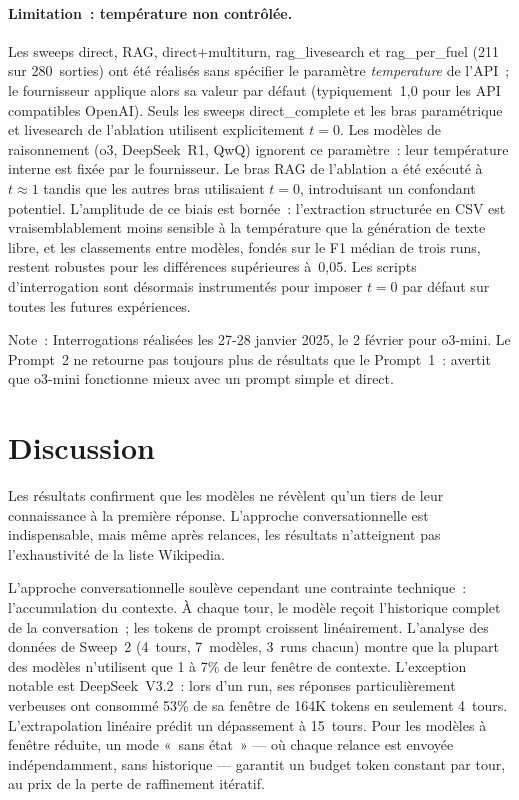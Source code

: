\documentclass[a4paper,11pt]{report}
\begin{document}
\paragraph{Limitation~: température non contrôlée.}\label{sec:temperature-limitation}
Les sweeps direct, RAG, direct+multiturn, rag\_livesearch et rag\_per\_fuel (211 sur 280~sorties) ont été réalisés sans spécifier le paramètre \emph{temperature} de l'API~; le fournisseur applique alors sa valeur par défaut (typiquement~1,0 pour les API compatibles OpenAI). Seuls les sweeps direct\_complete et les bras paramétrique et livesearch de l'ablation utilisent explicitement $t{=}0$. Les modèles de raisonnement (o3, DeepSeek~R1, QwQ) ignorent ce paramètre~: leur température interne est fixée par le fournisseur. Le bras RAG de l'ablation a été exécuté à $t{\approx}1$ tandis que les autres bras utilisaient $t{=}0$, introduisant un confondant potentiel. L'amplitude de ce biais est bornée~: l'extraction structurée en CSV est vraisemblablement moins sensible à la température que la génération de texte libre, et les classements entre modèles, fondés sur le F1 médian de trois runs, restent robustes pour les différences supérieures à~0,05. Les scripts d'interrogation sont désormais instrumentés pour imposer $t{=}0$ par défaut sur toutes les futures expériences.


Note~: Interrogations réalisées les 27-28 janvier 2025, le 2 février pour o3-mini. Le Prompt~2 ne retourne pas toujours plus de résultats que le Prompt~1~: \citep{2UNSUP7I} avertit que o3-mini fonctionne mieux avec un prompt simple et direct.

\section{Discussion}

Les résultats confirment que les modèles ne révèlent qu'un tiers de leur connaissance à la première réponse. L'approche conversationnelle est indispensable, mais même après relances, les résultats n'atteignent pas l'exhaustivité de la liste Wikipedia.

L'approche conversationnelle soulève cependant une contrainte technique~: l'accumulation du contexte. À chaque tour, le modèle reçoit l'historique complet de la conversation~; les tokens de prompt croissent linéairement. L'analyse des données de Sweep~2 (4~tours, 7~modèles, 3~runs chacun) montre que la plupart des modèles n'utilisent que 1 à 7\% de leur fenêtre de contexte. L'exception notable est DeepSeek~V3.2~: lors d'un run, ses réponses particulièrement verbeuses ont consommé 53\% de sa fenêtre de 164K tokens en seulement 4~tours. L'extrapolation linéaire prédit un dépassement à 15~tours. Pour les modèles à fenêtre réduite, un mode «~sans état~» --- où chaque relance est envoyée indépendamment, sans historique --- garantit un budget token constant par tour, au prix de la perte de raffinement itératif.
\end{document}
